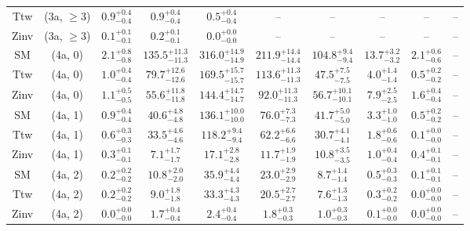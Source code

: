 \begin{table}[h!]
{\begin{tabular}{cccccccccc}
	Ttw & (3a, $\ge3$) & $0.9^{+ 0.4 }_{- 0.4 }$ & $0.9^{+ 0.4 }_{- 0.4 }$ & $0.5^{+ 0.4 }_{- 0.4 }$ & -- & -- & -- & -- & -- \\[0.5ex] 
	Zinv & (3a, $\ge3$) & $0.1^{+ 0.1 }_{- 0.1 }$ & $0.2^{+ 0.1 }_{- 0.1 }$ & $0.0^{+ 0.0 }_{- 0.0 }$ & -- & -- & -- & -- & -- \\[0.5ex] 
	SM & (4a, 0) & $2.1^{+ 0.8 }_{- 0.8 }$ & $135.5^{+ 11.3 }_{- 11.3 }$ & $316.0^{+ 14.9 }_{- 14.9 }$ & $211.9^{+ 14.4 }_{- 14.4 }$ & $104.8^{+ 9.4 }_{- 9.4 }$ & $13.7^{+ 3.2 }_{- 3.2 }$ & $2.1^{+ 0.6 }_{- 0.6 }$ & -- \\[0.5ex] 
	Ttw & (4a, 0) & $1.0^{+ 0.4 }_{- 0.4 }$ & $79.7^{+ 12.6 }_{- 12.6 }$ & $169.5^{+ 15.7 }_{- 15.7 }$ & $113.6^{+ 11.3 }_{- 11.3 }$ & $47.5^{+ 7.5 }_{- 7.5 }$ & $4.0^{+ 1.4 }_{- 1.4 }$ & $0.5^{+ 0.2 }_{- 0.2 }$ & -- \\[0.5ex] 
	Zinv & (4a, 0) & $1.1^{+ 0.5 }_{- 0.5 }$ & $55.6^{+ 11.8 }_{- 11.8 }$ & $144.4^{+ 14.7 }_{- 14.7 }$ & $92.0^{+ 11.3 }_{- 11.3 }$ & $56.7^{+ 10.1 }_{- 10.1 }$ & $7.9^{+ 2.5 }_{- 2.5 }$ & $1.6^{+ 0.4 }_{- 0.4 }$ & -- \\[0.5ex] 
	SM & (4a, 1) & $0.9^{+ 0.4 }_{- 0.4 }$ & $40.6^{+ 4.8 }_{- 4.8 }$ & $136.1^{+ 10.0 }_{- 10.0 }$ & $76.0^{+ 7.3 }_{- 7.3 }$ & $41.7^{+ 5.0 }_{- 5.0 }$ & $3.3^{+ 1.0 }_{- 1.0 }$ & $0.5^{+ 0.2 }_{- 0.2 }$ & -- \\[0.5ex] 
	Ttw & (4a, 1) & $0.6^{+ 0.3 }_{- 0.3 }$ & $33.5^{+ 4.6 }_{- 4.6 }$ & $118.2^{+ 9.4 }_{- 9.4 }$ & $62.2^{+ 6.6 }_{- 6.6 }$ & $30.7^{+ 4.1 }_{- 4.1 }$ & $1.8^{+ 0.6 }_{- 0.6 }$ & $0.1^{+ 0.0 }_{- 0.0 }$ & -- \\[0.5ex] 
	Zinv & (4a, 1) & $0.3^{+ 0.1 }_{- 0.1 }$ & $7.1^{+ 1.7 }_{- 1.7 }$ & $17.1^{+ 2.8 }_{- 2.8 }$ & $11.7^{+ 1.9 }_{- 1.9 }$ & $10.8^{+ 3.5 }_{- 3.5 }$ & $1.0^{+ 0.4 }_{- 0.4 }$ & $0.4^{+ 0.1 }_{- 0.1 }$ & -- \\[0.5ex] 
	SM & (4a, 2) & $0.2^{+ 0.2 }_{- 0.2 }$ & $10.8^{+ 2.0 }_{- 2.0 }$ & $35.9^{+ 4.4 }_{- 4.4 }$ & $23.0^{+ 2.9 }_{- 2.9 }$ & $8.7^{+ 1.4 }_{- 1.4 }$ & $0.5^{+ 0.3 }_{- 0.3 }$ & $0.1^{+ 0.1 }_{- 0.1 }$ & -- \\[0.5ex] 
	Ttw & (4a, 2) & $0.2^{+ 0.2 }_{- 0.2 }$ & $9.0^{+ 1.8 }_{- 1.8 }$ & $33.3^{+ 4.3 }_{- 4.3 }$ & $20.5^{+ 2.7 }_{- 2.7 }$ & $7.6^{+ 1.3 }_{- 1.3 }$ & $0.3^{+ 0.2 }_{- 0.2 }$ & $0.0^{+ 0.0 }_{- 0.0 }$ & -- \\[0.5ex] 
	Zinv & (4a, 2) & $0.0^{+ 0.0 }_{- 0.0 }$ & $1.7^{+ 0.4 }_{- 0.4 }$ & $2.4^{+ 0.4 }_{- 0.4 }$ & $1.8^{+ 0.3 }_{- 0.3 }$ & $1.0^{+ 0.3 }_{- 0.3 }$ & $0.1^{+ 0.0 }_{- 0.0 }$ & $0.0^{+ 0.0 }_{- 0.0 }$ & -- \\[0.5ex] 

\end{tabular}}
\end{table}
